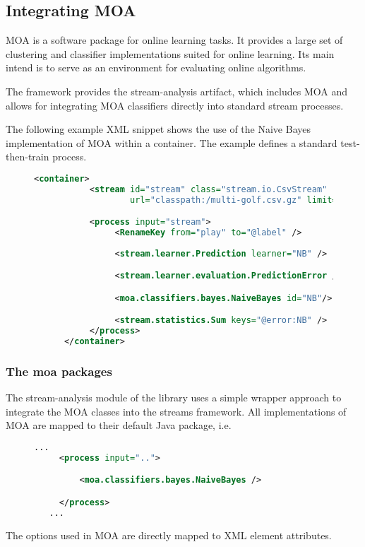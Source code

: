 \subsection{\label{sec:moa}Integrating MOA}

MOA is a software package for online learning tasks. It provides a
large set of clustering and classifier implementations suited for
online learning. Its main intend is to serve as an environment for
evaluating online algorithms.

The \streams framework provides the {\ttfamily stream-analysis}
artifact, which includes MOA and allows for integrating MOA
classifiers directly into standard stream processes.

The following example XML snippet shows the use of the Naive Bayes
implementation of MOA within a \streams container. The example defines
a standard test-then-train process.


\begin{figure}[h!]
  \centering
  \begin{lstlisting}[language=XML]
      <container>
           <stream id="stream" class="stream.io.CsvStream"
                   url="classpath:/multi-golf.csv.gz" limit="100"/>

           <process input="stream">
                <RenameKey from="play" to="@label" />
        
                <stream.learner.Prediction learner="NB" />

                <stream.learner.evaluation.PredictionError />

                <moa.classifiers.bayes.NaiveBayes id="NB"/>

                <stream.statistics.Sum keys="@error:NB" />
           </process>
      </container>
  \end{lstlisting}
  \caption{\label{fig:testThenTraing}}
\end{figure}

\subsubsection{The {\ttfamily moa} packages}
The {\ttfamily stream-analysis} module of the \streams library uses a
simple wrapper approach to integrate the MOA classes into the streams
framework. All implementations of MOA are mapped to their default Java
package, i.e.


\begin{figure}[h!]
  \centering
  \begin{lstlisting}[language=XML]
   ...
     <process input="..">

         <moa.classifiers.bayes.NaiveBayes />

     </process>
   ...
  \end{lstlisting}
  \caption{\label{fig:moaClassifierXML}}
\end{figure}

The options used in MOA are directly mapped to XML element attributes.

